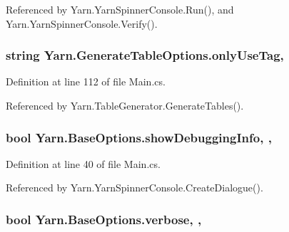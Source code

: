 Referenced by Yarn.\-Yarn\-Spinner\-Console.\-Run(), and Yarn.\-Yarn\-Spinner\-Console.\-Verify().

\hypertarget{a00097_a8b30c1b7fb1b74eae455a568c1024b3d}{
\subsubsection[{only\-Use\-Tag}]{\setlength{\rightskip}{0pt plus 5cm}string Yarn.\-Generate\-Table\-Options.\-only\-Use\-Tag\hspace{0.3cm}{\ttfamily [get]}, {\ttfamily [set]}}}\label{a00097_a8b30c1b7fb1b74eae455a568c1024b3d}


Definition at line 112 of file Main.\-cs.



Referenced by Yarn.\-Table\-Generator.\-Generate\-Tables().

\hypertarget{a00031_a89964ea17bd19caf00cb5bff563ed01c}{
\subsubsection[{show\-Debugging\-Info}]{\setlength{\rightskip}{0pt plus 5cm}bool Yarn.\-Base\-Options.\-show\-Debugging\-Info\hspace{0.3cm}{\ttfamily [get]}, {\ttfamily [set]}, {\ttfamily [inherited]}}}\label{a00031_a89964ea17bd19caf00cb5bff563ed01c}


Definition at line 40 of file Main.\-cs.



Referenced by Yarn.\-Yarn\-Spinner\-Console.\-Create\-Dialogue().

\hypertarget{a00031_ada4d83d1756918f362d55f6649b82b17}{
\subsubsection[{verbose}]{\setlength{\rightskip}{0pt plus 5cm}bool Yarn.\-Base\-Options.\-verbose\hspace{0.3cm}{\ttfamily [get]}, {\ttfamily [set]}, {\ttfamily [inherited]}}}\label{a00031_ada4d83d1756918f362d55f6649b82b17}


